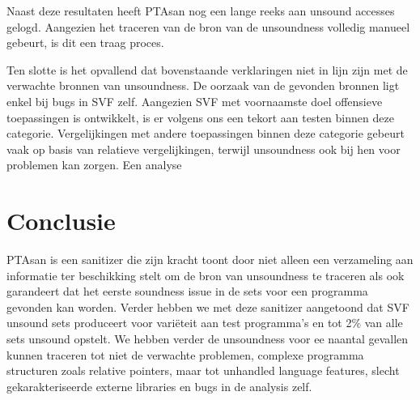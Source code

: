 \documentclass[conference]{IEEEtran}
\begin{document}
Naast deze resultaten heeft PTAsan nog een lange reeks aan unsound accesses gelogd. Aangezien het traceren van de bron van de unsoundness volledig manueel gebeurt, is dit een traag proces. 

Ten slotte is het opvallend dat bovenstaande verklaringen niet in lijn zijn met de verwachte bronnen van unsoundness. De oorzaak van de gevonden bronnen ligt enkel bij bugs in SVF zelf. Aangezien SVF met voornaamste doel offensieve toepassingen is ontwikkelt, is er volgens ons een tekort aan testen binnen deze categorie. Vergelijkingen met andere toepassingen binnen deze categorie gebeurt vaak op basis van relatieve vergelijkingen, terwijl unsoundness ook bij hen voor problemen kan zorgen. Een analyse 

\section{Conclusie}

PTAsan is een sanitizer die zijn kracht toont door niet alleen een verzameling aan informatie ter beschikking stelt om de bron van unsoundness te traceren als ook garandeert dat het eerste soundness issue in de sets voor een programma gevonden kan worden. Verder hebben we met deze sanitizer aangetoond dat SVF unsound sets produceert voor variëteit aan test programma's en tot 2\% van alle sets unsound opstelt. We hebben verder de unsoundness voor ee naantal gevallen kunnen traceren tot niet de verwachte problemen, complexe programma structuren zoals relative pointers, maar tot unhandled language features, slecht gekarakteriseerde externe libraries en bugs in de analysis zelf.  

\printbibliography
\end{document}

